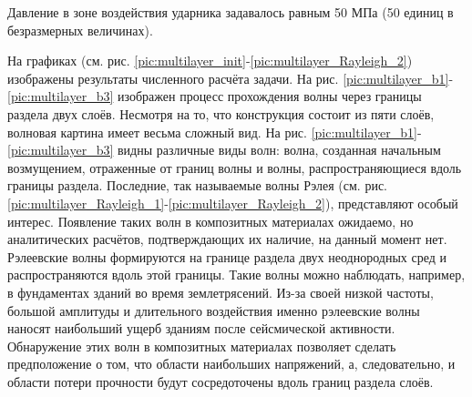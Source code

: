 Давление в зоне воздействия ударника задавалось равным 50 МПа (50 единиц в безразмерных величинах).

На графиках (см. рис. \ref{pic:multilayer_init}-\ref{pic:multilayer_Rayleigh_2})
изображены результаты численного расчёта задачи.
На рис. \ref{pic:multilayer_b1}-\ref{pic:multilayer_b3} изображен процесс
прохождения волны через границы раздела двух слоёв. Несмотря на то, что
конструкция состоит из пяти слоёв, волновая картина имеет весьма сложный
вид. На рис. \ref{pic:multilayer_b1}-\ref{pic:multilayer_b3} видны различные
виды волн: волна, созданная начальным возмущением, отраженные от границ волны и
волны, распространяющиеся вдоль границы раздела. Последние, так называемые волны
Рэлея (см. рис. \ref{pic:multilayer_Rayleigh_1}-\ref{pic:multilayer_Rayleigh_2}), 
представляют особый интерес. Появление таких волн в композитных материалах
ожидаемо, но аналитических расчётов, подтверждающих их наличие, на данный момент
нет. Рэлеевские волны формируются на границе раздела двух неоднородных сред и
распространяются вдоль этой границы. Такие волны можно наблюдать, например, в фундаментах
зданий во время землетрясений. Из-за своей низкой частоты, большой
амплитуды и длительного воздействия именно рэлеевские волны наносят наибольший
ущерб зданиям после сейсмической активности. Обнаружение этих волн в композитных
материалах позволяет сделать предположение о том, что области наибольших
напряжений, а, следовательно, и области потери прочности будут сосредоточены
вдоль границ раздела слоёв.

